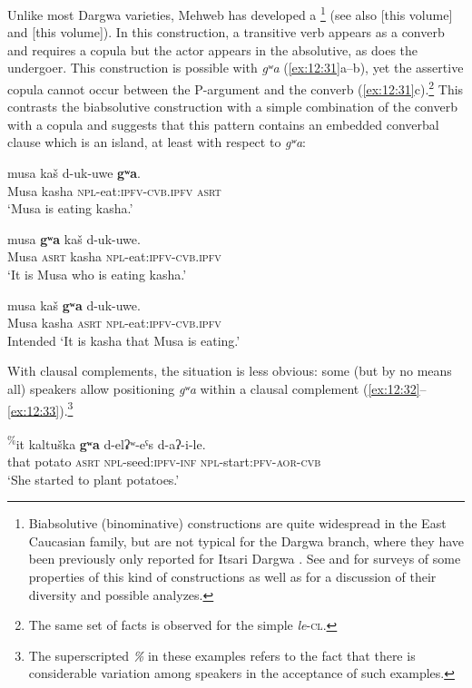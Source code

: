 ﻿\documentclass[output=paper]{langsci/langscibook}
\begin{document}
Unlike most Dargwa varieties, Mehweb has developed a \footnote{Biabsolutive (binominative) constructions are
  quite widespread in the East Caucasian family, but are not typical for
  the Dargwa branch, where they have been previously only reported for
  Itsari Dargwa \citep{mutalov-sumbatova2003}. See \citet{forker2012} and
  \citet{gagliardi-etal2014} for surveys of some properties of this kind of
  constructions as well as for a discussion of their diversity and
  possible analyzes.} (see also \citealt{daniel2019} [this volume] and \citealt{ganenkov2019} [this volume]). In this construction, a transitive verb appears as a converb
and requires a copula but the actor appears in the absolutive, as does
the undergoer. This construction is possible with \emph{gʷa} (\ref{ex:12:31}a–b),
yet the assertive copula cannot occur between the P-argument and the
converb (\ref{ex:12:31}c).\footnote{The same set of facts is observed for the simple
   \emph{le}-\textsc{cl}.} This contrasts the biabsolutive construction
with a simple combination of the converb with a copula and suggests that
this pattern contains an embedded converbal clause which is an island,
at least with respect to \emph{gʷa}:

\ea \label{ex:12:31} %
\ea %
\gll musa kaš d-uk-uwe \textbf{gʷa}.\\
Musa kasha \textsc{npl}-eat:\textsc{ipfv}-\textsc{cvb.ipfv} \textsc{asrt}\\
\glt `Musa is eating kasha.'

\ex %
\gll musa \textbf{gʷa} kaš d-uk-uwe.\\
Musa \textsc{asrt} kasha \textsc{npl}-eat:\textsc{ipfv}-\textsc{cvb.ipfv}\\
\glt `It is Musa who is eating kasha.'

\ex %
\gll *musa kaš \textbf{gʷa} d-uk-uwe.\\
Musa kasha \textsc{asrt} \textsc{npl}-eat:\textsc{ipfv}-\textsc{cvb.ipfv}\\
\glt Intended `It is kasha that Musa is eating.'
\z
\z

With clausal complements, the situation is less obvious: some (but by no
means all) speakers allow positioning \emph{gʷa} within a clausal
complement (\ref{ex:12:32}–\ref{ex:12:33}).\footnote{The superscripted \emph{\%} in these
  examples refers to the fact that there is considerable variation among
  speakers in the acceptance of such examples.}

\ea \label{ex:12:32} %
\gll \textsuperscript{\%}it kaltuška \textbf{gʷa} d-elʡʷ-eˤs d-aʔ-i-le.\\
that potato \textsc{asrt} \textsc{npl}-seed:\textsc{ipfv}-\textsc{inf} \textsc{npl}-start:\textsc{pfv}-\textsc{aor}-\textsc{cvb}\\
\glt `She started to plant potatoes.'
\end{document}
